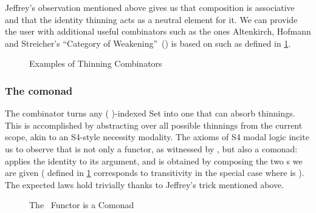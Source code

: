 Jeffrey's observation mentioned above gives us that composition is
associative and that the identity thinning acts as a neutral
element for it. We can provide the user with additional useful
combinators such as the ones Altenkirch, Hofmann and Streicher's
``Category of Weakening''~(\citeyear{altenkirch1995categorical})
is based on such as  defined in \cref{fig:extendth}.

\begin{figure}[h]
\begin{minipage}{0.5\textwidth}
\end{minipage}\begin{minipage}{0.5\textwidth}
\end{minipage}

\caption{Examples of Thinning Combinators\label{fig:extendth}}
\end{figure}

\subsubsection{The  comonad}

The  combinator turns any ( )-indexed Set into
one that can absorb thinnings. This is accomplished by abstracting
over all possible thinnings from the current scope, akin to an
S4-style necessity modality. The axioms of S4 modal logic incite us
to observe that  is not only a functor, as witnessed by
, but also a comonad:  applies
the identity  to its argument, and  is obtained
by composing the two s we are given ( defined in
\cref{fig:extendth} corresponds to transitivity in the special case
where  is ). The expected laws hold trivially thanks
to Jeffrey's trick mentioned above.

\begin{figure}[h]
\begin{minipage}{0.5\textwidth}
\end{minipage}\begin{minipage}{0.5\textwidth}
\end{minipage}

\begin{minipage}{0.5\textwidth}
\end{minipage}\begin{minipage}{0.5\textwidth}
\end{minipage}
\caption{The ~Functor is a Comonad}\label{fig:boxcomonad}
\end{figure}

